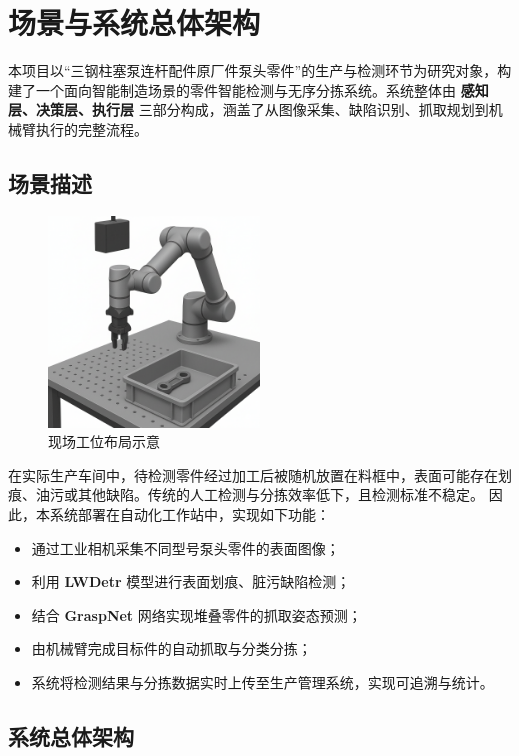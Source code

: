 \documentclass{cumcmthesis}
\begin{document}
\section{场景与系统总体架构}

本项目以“三钢柱塞泵连杆配件原厂件泵头零件”的生产与检测环节为研究对象，构建了一个面向智能制造场景的零件智能检测与无序分拣系统。系统整体由 \textbf{感知层、决策层、执行层} 三部分构成，涵盖了从图像采集、缺陷识别、抓取规划到机械臂执行的完整流程。

\subsection{场景描述}

\begin{figure}[htbp]
    \centering
    \includegraphics[width=0.5\textwidth]{bg_rm.png}
    \caption{现场工位布局示意}\label{fig:cell_layout}
\end{figure}
在实际生产车间中，待检测零件经过加工后被随机放置在料框中，表面可能存在划痕、油污或其他缺陷。传统的人工检测与分拣效率低下，且检测标准不稳定。  
因此，本系统部署在自动化工作站中，实现如下功能：

\begin{itemize}
    \item 通过工业相机采集不同型号泵头零件的表面图像；
    \item 利用 \textbf{LWDetr} 模型进行表面划痕、脏污缺陷检测；
    \item 结合 \textbf{GraspNet} 网络实现堆叠零件的抓取姿态预测；
    \item 由机械臂完成目标件的自动抓取与分类分拣；
    \item 系统将检测结果与分拣数据实时上传至生产管理系统，实现可追溯与统计。
\end{itemize}

\subsection{系统总体架构}
\end{document}
